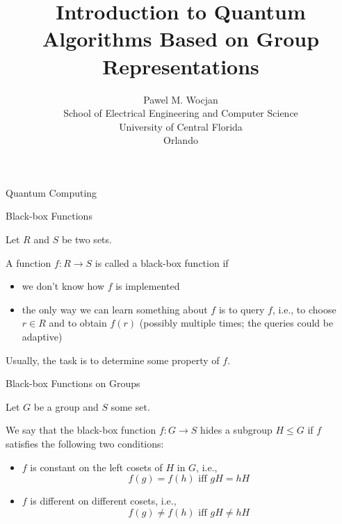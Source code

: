 \documentclass[slideColor]{prosper}
\title{Introduction to Quantum Algorithms Based on Group Representations}
\author{Pawel M. Wocjan\\[1ex]School of Electrical Engineering and Computer Science\\ University of Central Florida\\Orlando}
\renewcommand{\>}{\rangle}
\newcommand{\<}{\langle}
\begin{document}
\maketitle


\begin{slide}{Quantum Computing}

\end{slide}


\begin{slide}{Black-box Functions}

Let $R$ and $S$ be two sets.

\medskip
A function $f : R \rightarrow S$ is called a black-box function if

\begin{itemize}
\item we don't know how $f$ is implemented 
\item the only way we can learn something about $f$ is to query $f$, i.e., to choose $r\in R$ and to obtain $f(r)$ (possibly multiple times; the queries could be adaptive)
\end{itemize}

Usually, the task is to determine some property of $f$.

\end{slide}


\begin{slide}{Black-box Functions on Groups}

Let $G$ be a group and $S$ some set.

\bigskip
We say that the black-box function $f : G \rightarrow S$ hides a subgroup $H\le G$ if $f$ satisfies the following two conditions:

\begin{itemize}
\item $f$ is constant on the left cosets of $H$ in $G$, i.e.,
\[
f(g)=f(h) \mbox{ iff $gH=hH$}
\]
\item $f$ is different on different cosets, i.e., 
\[
f(g)\neq f(h) \mbox{ iff $gH\neq hH$}
\]
\end{itemize}

\end{slide}
\end{document}
